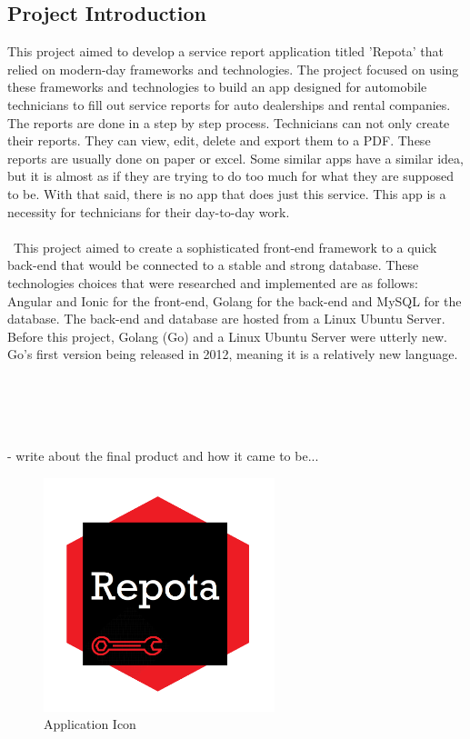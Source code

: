 \documentclass{article}
\begin{document}
\subsection{Project Introduction}
This project aimed to develop a service report application titled 'Repota' that relied on modern-day frameworks and technologies. The project focused on using these frameworks and technologies to build an app designed for automobile technicians to fill out service reports for auto dealerships and rental companies. The reports are done in a step by step process. Technicians can not only create their reports. They can view, edit, delete and export them to a PDF. These reports are usually done on paper or excel. Some similar apps have a similar idea, but it is almost as if they are trying to do too much for what they are supposed to be. With that said, there is no app that does just this service. This app is a necessity for technicians for their day-to-day work.
\\\\\ This project aimed to create a  sophisticated front-end framework to a quick back-end that would be connected to a stable and strong database. These technologies choices that were researched and implemented are as follows: Angular and Ionic for the front-end, Golang for the back-end and MySQL for the database. The back-end and database are hosted from a Linux Ubuntu Server. Before this project, Golang (Go) and a Linux Ubuntu Server were utterly new. Go's first version being released in 2012, meaning it is a relatively new language. 

\\\\\ \\\\
- write about the final product and how it came to be... 
\newpage

\begin{figure}[h!]
    \caption{Application Icon} %
    \label{image:repotaChatLogo}
    \centering
    \includegraphics[width=0.6\textwidth]{images/repotaApp_logo.png}
\end{figure}
\end{document}
